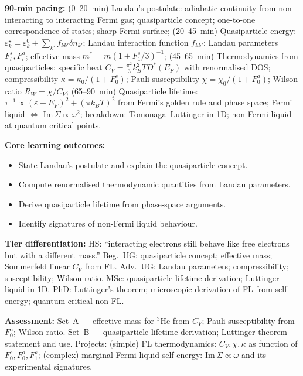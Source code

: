 \documentclass[11pt,a4paper]{article}
\begin{document}
\medskip

\begin{tcolorbox}[modulebox, title={Module~II.7 --- Lecture L05: Fermi Liquid Theory}]
\textbf{90-min pacing:} (0--20~min) Landau's postulate: adiabatic continuity from non-interacting to interacting Fermi gas; quasiparticle concept; one-to-one correspondence of states; sharp Fermi surface; (20--45~min) Quasiparticle energy: $\varepsilon_k^\star=\varepsilon_k^0+\sum_{k'}f_{kk'}\delta n_{k'}$; Landau interaction function $f_{kk'}$; Landau parameters $F_l^s,F_l^a$; effective mass $m^*=m(1+F_1^s/3)^{-1}$; (45--65~min) Thermodynamics from quasiparticles: specific heat $C_V=\tfrac{\pi^2}{3}k_B^2T D^*(E_F)$ with renormalised DOS; compressibility $\kappa=\kappa_0/(1+F_0^s)$; Pauli susceptibility $\chi=\chi_0/(1+F_0^a)$; Wilson ratio $R_W=\chi/C_V$; (65--90~min) Quasiparticle lifetime: $\tau^{-1}\propto(\varepsilon-E_F)^2+(\pi k_BT)^2$ from Fermi's golden rule and phase space; Fermi liquid $\Leftrightarrow$ Im$\,\Sigma\propto\omega^2$; breakdown: Tomonaga--Luttinger in 1D; non-Fermi liquid at quantum critical points.

\medskip\textbf{Core learning outcomes:}
\begin{itemize}[leftmargin=1.4em,topsep=2pt,itemsep=1pt]
  \item State Landau's postulate and explain the quasiparticle concept.
  \item Compute renormalised thermodynamic quantities from Landau parameters.
  \item Derive quasiparticle lifetime from phase-space arguments.
  \item Identify signatures of non-Fermi liquid behaviour.
\end{itemize}

\medskip\textbf{Tier differentiation:}
HS: ``interacting electrons still behave like free electrons but with a different mass.''
Beg.\ UG: quasiparticle concept; effective mass; Sommerfeld linear $C_V$ from FL.
Adv.\ UG: Landau parameters; compressibility; susceptibility; Wilson ratio.
MSc: quasiparticle lifetime derivation; Luttinger liquid in 1D.
PhD: Luttinger's theorem; microscopic derivation of FL from self-energy; quantum critical non-FL.

\medskip\textbf{Assessment:}
Set~A --- effective mass for $^3$He from $C_V$; Pauli susceptibility from $F_0^a$; Wilson ratio.
Set~B --- quasiparticle lifetime derivation; Luttinger theorem statement and use.
Projects: (simple) FL thermodynamics: $C_V,\chi,\kappa$ as function of $F_0^s,F_0^a,F_1^s$;
(complex) marginal Fermi liquid self-energy: Im$\,\Sigma\propto\omega$ and its experimental signatures.
\end{tcolorbox}
\end{document}
